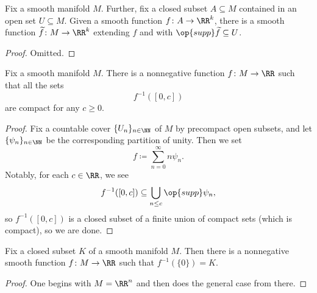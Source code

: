\documentclass[../notes.tex]{subfiles}
\begin{document}
\begin{corollary} \label{cor:extension-lemma}
	Fix a smooth manifold $M$. Further, fix a closed subset $A\subseteq M$ contained in an open set $U\subseteq M$. Given a smooth function $f\colon A\to\RR^k$, there is a smooth function $\widetilde f\colon M\to\RR^k$ extending $f$ and with $\op{supp}\widetilde f\subseteq U$.
\end{corollary}
\begin{proof}
	Omitted.
\end{proof}
\begin{corollary}
	Fix a smooth manifold $M$. There is a nonnegative function $f\colon M\to\RR$ such that all the sets
	\[f^{-1}([0,c])\]
	are compact for any $c\ge0$.
\end{corollary}
\begin{proof}
	Fix a countable cover $\{U_n\}_{n\in\NN}$ of $M$ by precompact open subsets, and let $\{\psi_n\}_{n\in\NN}$ be the corresponding partition of unity. Then we set
	\[f\coloneqq\sum_{n=0}^\infty n\psi_n.\]
	Notably, for each $c\in\RR$, we see
	\[f^{-1}([0,c])\subseteq\bigcup_{n\le c}\op{supp}\psi_n,\]
	so $f^{-1}([0,c])$ is a closed subset of a finite union of compact sets (which is compact), so we are done.
\end{proof}
\begin{corollary}
	Fix a closed subset $K$ of a smooth manifold $M$. Then there is a nonnegative smooth function $f\colon M\to\RR$ such that $f^{-1}(\{0\})=K$.
\end{corollary}
\begin{proof}
	One begins with $M=\RR^n$ and then does the general case from there.
\end{proof}
\end{document}

